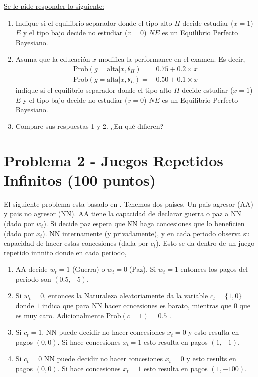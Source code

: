 \documentclass[11pt]{article}
\begin{document}
\underline{Se le pide responder lo siguiente:}
\begin{enumerate}
	\item Indique si el equilibrio separador donde el tipo alto $H$ decide estudiar ($x=1$) $E$ y el tipo bajo decide no estudiar ($x=0$) $NE$ es un Equilibrio Perfecto Bayesiano.
	\item Asuma que la educaci\'on $x$ modifica la performance en el examen. Es decir,
	\begin{align*}
		\text{Prob}(g = \text{alta}|x,\theta_{H}) = & 0.75 + 0.2 \times x \\
		\text{Prob}(g = \text{alta}|x,\theta_{L}) = & 0.50 + 0.1 \times x 
	\end{align*} indique si el equilibrio separador donde el tipo alto $H$ decide estudiar ($x=1$) $E$ y el tipo bajo decide no estudiar ($x=0$) $NE$ es un Equilibrio Perfecto Bayesiano.
	\item Compare sus respuestas 1 y 2. ¿En qu\'e difieren?
\end{enumerate}

\section*{Problema 2 - Juegos Repetidos Infinitos (100 puntos)}

El siguiente problema esta basado en \cite{yared2010dynamic}. Tenemos dos paises. Un pais agresor (AA) y pais no agresor (NN). AA tiene la capacidad de declarar guerra o paz a NN (dado por $w_{t}$). Si decide paz espera que NN haga concesiones que lo beneficien (dado por $x_{t}$). NN internamente (y privadamente), y en cada periodo observa su capacidad de hacer estas concesiones (dada por $c_{t}$). Esto se da dentro de un juego repetido infinito donde en cada periodo,
\begin{enumerate}
	\item AA decide $w_{t} = 1$ (Guerra) o $w_{t} = 0$ (Paz). Si $w_{t} = 1$ entonces los pagos del periodo son $(0.5,-5)$.
	\item Si $w_{t} = 0$, entonces la Naturaleza aleatoriamente da la variable $c_{t} = \{1,0\}$ donde $1$ indica que para NN hacer concesiones es barato, mientras que $0$ que es muy caro. Adicionalmente $\text{Prob}(c=1) = 0.5$ .
	\item Si $c_{t} = 1$. NN puede decidir no hacer concesiones $x_{t} = 0$ y esto resulta en pagos $(0,0)$. Si hace concesiones $x_{t} = 1$ esto resulta en pagos $(1,-1)$.
	\item Si $c_{t} = 0$ NN puede decidir no hacer concesiones $x_{t} = 0$ y esto results en pagos $(0,0)$. Si hace concesiones $x_{t} = 1$ esto resulta en pagos $(1,-100)$.
\end{enumerate}
\end{document}

